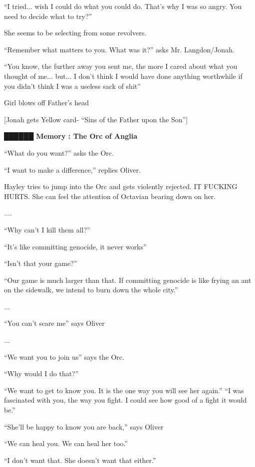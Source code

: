``I tried... wish I could do what you could do. That's why I was so angry.  You need to decide what to try?''

She seems to be selecting from some revolvers.

``Remember what matters to you.  What was it?'' asks Mr. Langdon/Jonah.

``You know, the further away you sent me, the more I cared about what you thought of me... but... I don't think I would have done anything worthwhile if you didn't think I was a useless sack of shit''

Girl blows off Father's head



{[}Jonah gets Yellow card- ``Sins of the Father upon the Son''{]}



 {\LARGE \textbf{ {\color[RGB]{51,51,51}██████} } }  {\LARGE \textbf{ Memory : The Orc of Anglia} } 

``What do you want?'' asks the Orc.

``I want to make a difference,'' replies Oliver.



Hayley tries to jump into the Orc and gets violently rejected.  IT FUCKING HURTS.  She can feel the attention of Octavian bearing down on her.

....

``Why can't I kill them all?''

``It's like committing genocide, it never works''

``Isn't that your game?''

``Our game is much larger than that. If committing genocide is like frying an ant on the sidewalk, we intend to burn down the whole city.''

...

``You can't scare me'' says Oliver

...

``We want you to join us'' says the Orc.

``Why would I do that?''

``We want to get to know you.  It is the one way you will see her again.'' ``I was fascinated with you, the way you fight.  I could see how good of a fight it would be.''

``She'll be happy to know you are back,'' says Oliver

``We can heal you.  We can heal her too.''

``I don't want that.  She doesn't want that either.''

